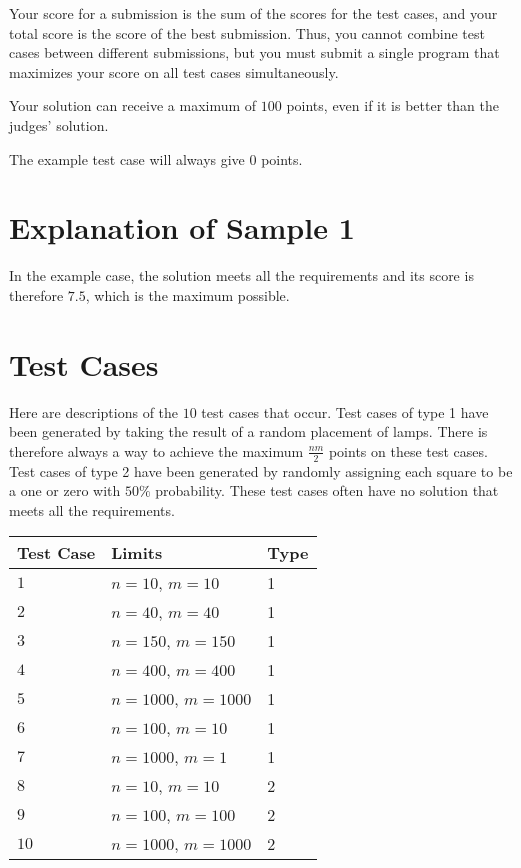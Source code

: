Your score for a submission is the sum of the scores for the test cases, and your total score is the score of the best submission.
Thus, you cannot combine test cases between different submissions, but you must submit a single program that maximizes your score on all test cases simultaneously.

Your solution can receive a maximum of $100$ points, even if it is better than the judges' solution.

The example test case will always give $0$ points.


\section*{Explanation of Sample 1}
In the example case, the solution meets all the requirements and its score is therefore $7.5$, which is the maximum possible.

\section*{Test Cases}
Here are descriptions of the $10$ test cases that occur.
Test cases of type 1 have been generated by taking the result of a random placement of lamps.
There is therefore always a way to achieve the maximum $\frac{nm}{2}$ points on these test cases.
Test cases of type 2 have been generated by randomly assigning each square to be a one or zero with $50\%$ probability. These test cases often have no solution that meets all the requirements.

\noindent
\begin{tabular}{| l | l | l |}
\hline
Test Case & Limits                                    & Type  \\ \hline
$1$       & $n = 10$, $m = 10$                        & 1  \\ \hline
$2$       & $n = 40$, $m = 40$                        & 1   \\ \hline
$3$       & $n = 150$, $m = 150$                      & 1   \\ \hline
$4$       & $n = 400$, $m = 400$                      & 1  \\ \hline
$5$       & $n = 1000$, $m = 1000$                    & 1   \\ \hline
$6$       & $n = 100$, $m = 10$                       & 1   \\ \hline
$7$       & $n = 1000$, $m = 1$                       & 1   \\ \hline
$8$       & $n = 10$, $m = 10$                        & 2  \\ \hline
$9$       & $n = 100$, $m = 100$                      & 2   \\ \hline
$10$      & $n = 1000$, $m = 1000$                    & 2   \\ \hline
\end{tabular}
